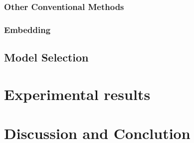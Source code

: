 \documentclass{llncs}
\begin{document}
\subsubsection{Other Conventional Methods}
\subsubsection{Embedding}

\subsection{Model Selection}

\section{Experimental results}




\section{Discussion and Conclution}



%
%
%

% 




\clearpage
{} %
\renewcommand{\indexname}{Author Index}
\printindex
\clearpage
{} %
\renewcommand{\indexname}{Subject Index}

\end{document}

